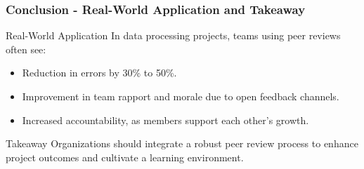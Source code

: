 \documentclass{beamer}
\begin{document}
\begin{frame}[fragile]
    \frametitle{Conclusion - Real-World Application and Takeaway}
    \begin{block}{Real-World Application}
        In data processing projects, teams using peer reviews often see:
        \begin{itemize}
            \item Reduction in errors by 30\% to 50\%.
            \item Improvement in team rapport and morale due to open feedback channels.
            \item Increased accountability, as members support each other's growth.
        \end{itemize}
    \end{block}
    
    \begin{block}{Takeaway}
        Organizations should integrate a robust peer review process to enhance project outcomes and cultivate a learning environment.
    \end{block}
\end{frame}
\end{document}
